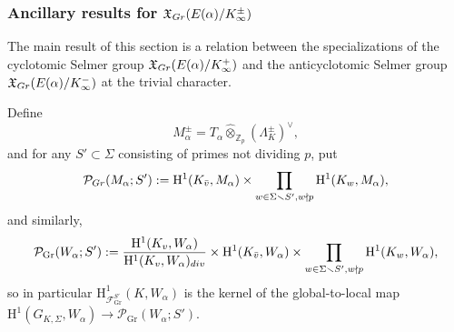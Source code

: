 \documentclass[a4paper,10pt]{amsart}
\numberwithin{equation}{section}
\numberwithin{equation}{section}
\theoremstyle{plain}
\theoremstyle{definition}
\theoremstyle{definition}
\theoremstyle{plain}
\newtheorem{prop}[thm]{Proposition}
\theoremstyle{plain}
\theoremstyle{plain}
\theoremstyle{plain}
\newcommand{\Z}{\mathbb{Z}}
\newcommand{\Q}{\mathbb{Q}}
\newcommand{\X}{\mathfrak{X}}
\DeclareMathOperator{\ch}{ch}
\DeclareMathOperator{\Gr}{Gr}
\newcommand{\Fcal}{\mathcal{F}}
\newcommand{\rH}{\mathrm{H}}
\begin{document}
\subsubsection{Ancillary results for $\X_{\rm Gr}(E(\alpha)/K_\infty^\pm)$}
The main result of this section is a relation between the specializations  of the cyclotomic Selmer group $\X_{\rm Gr}(E(\alpha)/K_\infty^+)$ and the anticyclotomic Selmer group $\X_{\rm Gr}(E(\alpha)/K_\infty^-)$ at the trivial character. 

Define
\[
M_\alpha^\pm=T_\alpha\widehat\otimes_{\Z_p}(\Lambda_K^\pm)^\vee,
\]
and for any $S'\subset\Sigma$ consisting of primes not dividing $p$, put
\[
\mathcal{P}_{\rm Gr}(M_\alpha;S'):=\rH^1(K_{\bar{v}},M_\alpha)\times
\prod_{w\in\Sigma\smallsetminus S', w\nmid p}\rH^1(K_w,M_\alpha),
\]
and similarly,
\[
\mathcal{P}_{\Gr}(W_\alpha;S'):=\frac{\rH^1(K_v,W_\alpha)}{\rH^1(K_v,W_\alpha)_{\rm div}}\times\rH^1(K_{\bar{v}},W_\alpha)\times
\prod_{w\in\Sigma\smallsetminus S', w\nmid p}\rH^1(K_w,W_\alpha),
\]
so in particular $\rH^1_{\Fcal_{\Gr}^{S'}}(K,W_\alpha)$ is the kernel of the global-to-local map $\rH^1(G_{K,\Sigma},W_\alpha)\rightarrow\mathcal{P}_{\Gr}(W_\alpha;S')$.



\end{document}
